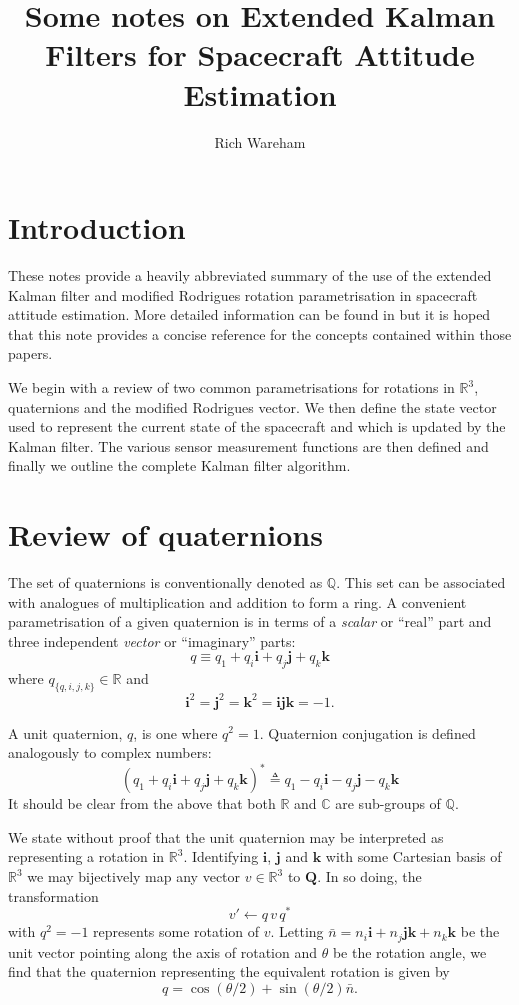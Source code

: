 \documentclass[a4paper]{paper}
\title{Some notes on Extended Kalman Filters for Spacecraft Attitude Estimation}
\author{Rich Wareham}
\begin{document}
\maketitle

\section{Introduction}

These notes provide a heavily abbreviated summary of the use of the extended
Kalman filter and modified Rodrigues rotation parametrisation in spacecraft
attitude estimation. More detailed information can be found in
\cite{crassidis1996attitude, karlgaard2009nonsingular} but it is hoped that this
note provides a concise reference for the concepts contained within those
papers.

We begin with a review of two common parametrisations for rotations in
$\mathbb{R}^3$, quaternions and the modified Rodrigues vector. We then define
the state vector used to represent the current state of the spacecraft and which
is updated by the Kalman filter. The various sensor measurement functions are
then defined and finally we outline the complete Kalman filter algorithm.

\section{Review of quaternions}

The set of quaternions is conventionally denoted as $\mathbb{Q}$. This set can
be associated with analogues of multiplication and addition to form a ring.  A
convenient parametrisation of a given quaternion is in terms of a
\emph{scalar} or ``real'' part and three independent \emph{vector} or
``imaginary'' parts:
$$
q \equiv q_1 + q_i \mathbf{i} + q_j \mathbf{j} + q_k \mathbf{k}
$$
where $q_{\{q,i,j,k\}} \in \mathbb{R}$ and
$$
\mathbf{i}^2 = \mathbf{j}^2 = \mathbf{k}^2 = \mathbf{ijk} = -1.
$$

A unit quaternion, $q$, is one where $q^2 = 1$. Quaternion conjugation is
defined analogously to complex numbers:
$$
\left(
	q_1 + q_i \mathbf{i} + q_j \mathbf{j} + q_k \mathbf{k}
\right)^* \triangleq
	q_1 - q_i \mathbf{i} - q_j \mathbf{j} - q_k \mathbf{k}
$$
It should be clear from the above that both $\mathbb{R}$ and $\mathbb{C}$ are
sub-groups of $\mathbb{Q}$.

We state without proof that the unit quaternion may be interpreted as
representing a rotation in $\mathbb{R}^3$. Identifying $\mathbf{i}$,
$\mathbf{j}$ and $\mathbf{k}$ with some Cartesian basis of $\mathbb{R}^3$ we may
bijectively map any vector $v \in \mathbb{R}^3$ to $\mathbf{Q}$. In so doing,
the transformation
$$
v' \leftarrow q \, v \, q^*
$$
with $q^2 = -1$ represents some rotation of $v$. Letting $\bar{n} = n_i
\mathbf{i} + n_j \mathbf{jk} + n_k \mathbf{k}$ be the unit vector pointing along
the axis of rotation and $\theta$ be the rotation angle, we find that the
quaternion representing the equivalent rotation is given by
$$
q = \cos\left(\theta / 2\right) + \sin\left(\theta / 2\right) \bar{n}.
$$
\end{document}
